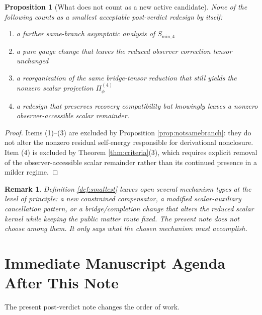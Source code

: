 \documentclass[11pt]{article}
\newtheorem{proposition}{Proposition}
\newtheorem{remark}{Remark}
\begin{document}
\begin{proposition}[What does not count as a new active candidate]
\label{prop:notnew}
None of the following counts as a smallest acceptable post-verdict redesign by itself:
\begin{enumerate}
    \item a further same-branch asymptotic analysis of \(S_{\mathrm{min},4}\)
    \item a pure gauge change that leaves the reduced observer correction tensor unchanged
    \item a reorganization of the same bridge-tensor reduction that still yields the nonzero scalar projection \(\Pi_\phi^{(4)}\)
    \item a redesign that preserves recovery compatibility but knowingly leaves a nonzero observer-accessible scalar remainder.
\end{enumerate}
\end{proposition}

\begin{proof}
Items (1)--(3) are excluded by Proposition \ref{prop:notsamebranch}: they do not alter the nonzero residual self-energy responsible for derivational nonclosure. Item (4) is excluded by Theorem \ref{thm:criteria}(3), which requires explicit removal of the observer-accessible scalar remainder rather than its continued presence in a milder regime.
\end{proof}

\begin{remark}
Definition \ref{def:smallest} leaves open several mechanism types at the level of principle: a new constrained compensator, a modified scalar-auxiliary cancellation pattern, or a bridge/completion change that alters the reduced scalar kernel while keeping the public matter route fixed. The present note does not choose among them. It only says what the chosen mechanism must accomplish.
\end{remark}

\section{Immediate Manuscript Agenda After This Note}

The present post-verdict note changes the order of work.
\end{document}
